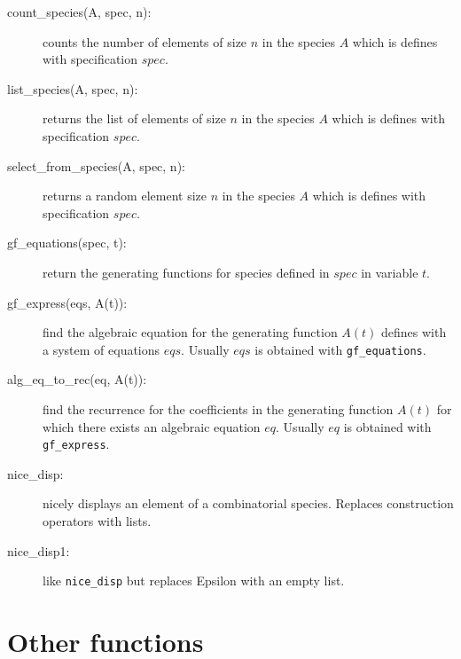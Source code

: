 \documentclass[11pt]{article}
\begin{document}
\begin{description}
  \item[count\_species(A, spec, n):] counts the number of elements of
    size $n$ in the species $A$ which is defines with specification
    $spec$.
  \item[list\_species(A, spec, n):] returns the list of elements of
    size $n$ in the species $A$ which is defines with specification
    $spec$.
  \item[select\_from\_species(A, spec, n):] returns a random element
    size $n$ in the species $A$ which is defines with specification
    $spec$.
  \item[gf\_equations(spec, t):] return the generating functions for
    species defined in $spec$ in variable $t$.
  \item[gf\_express(eqs, A(t)):] find the algebraic equation for the
    generating function $A(t)$ defines with a system of equations
    $eqs$. Usually $eqs$ is obtained with \texttt{gf\_equations}.
  \item[alg\_eq\_to\_rec(eq, A(t)):] find the recurrence for the
    coefficients in the generating function $A(t)$ for which there
    exists an algebraic equation $eq$. Usually $eq$ is obtained with
    \texttt{gf\_express}.
   \item[nice\_disp:] nicely displays an element of a combinatorial
   	species. Replaces construction operators with lists.
   \item[nice\_disp1:] like \verb|nice_disp| but replaces Epsilon with
   	an empty list.
\end{description}

\section{Other functions}
\end{document}
